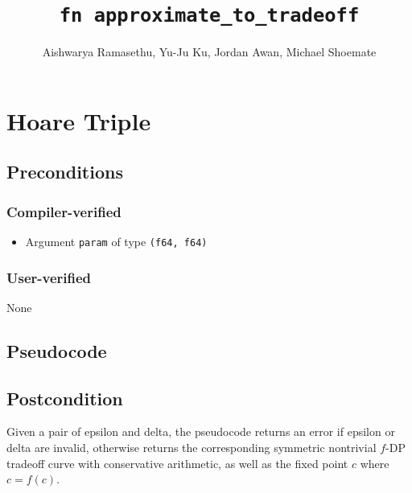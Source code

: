 \documentclass{article}
\title{\texttt{fn approximate\_to\_tradeoff}}
\author{Aishwarya Ramasethu, Yu-Ju Ku, Jordan Awan, Michael Shoemate}
\begin{document}
\maketitle

\section{Hoare Triple}

\subsection*{Preconditions}
\subsubsection*{Compiler-verified}
\begin{itemize}
    \item Argument \texttt{param} of type \texttt{(f64, f64)}
\end{itemize}

\subsubsection*{User-verified}
None

\subsection*{Pseudocode}



\subsection*{Postcondition}

\begin{theorem}
    Given a pair of epsilon and delta, the pseudocode returns an error if epsilon or delta are invalid,
    otherwise returns the corresponding symmetric nontrivial $f$-DP tradeoff curve
    with conservative arithmetic, 
    as well as the fixed point $c$ where $c = f(c)$.
\end{theorem}
\end{document}
